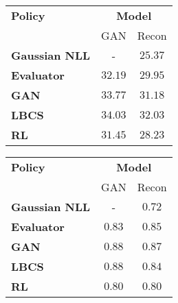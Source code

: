 \begin{figure}[h]
\begin{minipage}[c]{0.48\textwidth}
\begin{center}
    \begin{tabular}{lcc}
     \toprule
    \multirow{1}{*}{\textbf{Policy}}& \multicolumn{2}{c}{\textbf{Model}}\\
    \cmidrule{2-3} & GAN & Recon\\
    \midrule
    \textbf{Gaussian NLL}  & - & $25.37$\\
    \textbf{Evaluator} & $32.19$& $29.95$\\
    \textbf{GAN} & $33.77$& $31.18$\\
    \midrule
    \textbf{LBCS} & $\mathbf{34.03}$& $\mathbf{32.03}$\\
    \textbf{RL} & $31.45$& $28.23$ \\
    \bottomrule
    \end{tabular}
    \label{tab:comp_brain_psnr} 
\end{center}
\end{minipage}
\hfill
\begin{minipage}[c]{0.48\textwidth}
\begin{center}
     \begin{tabular}{lcc}
     \toprule
    \multirow{1}{*}{\textbf{Policy}}& \multicolumn{2}{c}{\textbf{Model}}\\
    \cmidrule{2-3} &GAN & Recon\\
    \midrule
    \textbf{Gaussian NLL} & - & $0.72$\\
    \textbf{Evaluator} & $0.83$& $0.85$\\
    \textbf{GAN} & $\mathbf{0.88}$ & $\mathbf{0.87}$\\
    \midrule
    \textbf{LBCS} &  $\mathbf{0.88}$& $0.84$\\
    \textbf{RL} &$0.80$ & $0.80$\\
    \bottomrule
    \end{tabular}
    \label{tab:comp_brain_ssim} 
\end{center}
\end{minipage}
\end{figure}